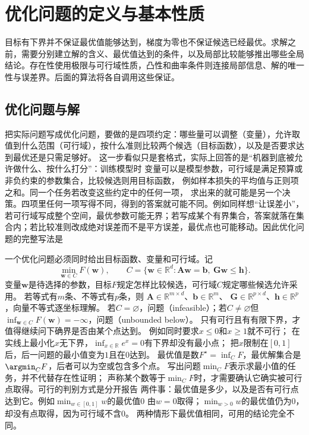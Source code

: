 \section{优化问题的定义与基本性质}
\label{sec:opt-objectives-solutions-curvature}

目标有下界并不保证最优值能够达到，梯度为零也不保证候选已经最优。求解之前，需要分别建立解的含义、最优值达到的条件，以及局部比较能够推出哪些全局结论。存在性使用极限与可行域性质，凸性和曲率条件则连接局部信息、解的唯一性与误差界。后面的算法将各自调用这些保证。

\subsection{优化问题与解}
\label{sec:opt-problem-and-solutions}
\label{sec:opt-error-objects}

把实际问题写成优化问题，要做的是四项约定：哪些量可以调整（变量），允许取值到什么范围（可行域），按什么准则比较两个候选（目标函数），以及是否要求达到最优还是只需足够好。
这一步看似只是套格式，实际上回答的是“机器到底被允许做什么、按什么打分”：训练模型时
变量可以是模型参数，可行域是满足预算或非负约束的参数集合，比较候选则用目标函数，
例如样本损失的平均值与正则项之和。同一个任务若改变这些约定中的任何一项，
求出来的就可能是另一个决策。四项里任何一项写得不同，得到的答案就可能不同。例如同样想“让误差小”，若可行域写成整个空间，最优参数可能无界；若写成某个有界集合，答案就落在集合内；若比较准则改成绝对误差而不是平方误差，最优点也可能移动。因此优化问题的完整写法是

一个优化问题必须同时给出目标函数、变量和可行域。记
\[
  \min_{\bm{w}\in C}F(\bm{w}),\qquad
  C=\{\bm{w}\in\mathbb{R}^d:
  \bm{A}\bm{w}=\bm{b},\ \bm{G}\bm{w}\leq\bm{h}\}.
\]
变量$\bm w$是待选择的参数，目标$F$规定怎样比较候选，可行域$C$规定哪些候选允许采用。
若等式有$m$条、不等式有$p$条，则
$\bm A\in\mathbb R^{m\times d}$、$\bm b\in\mathbb R^m$、
$\bm G\in\mathbb R^{p\times d}$、$\bm h\in\mathbb R^p$，向量不等式逐坐标理解。
若$C=\varnothing$，问题（infeasible）；若$C\neq\varnothing$但
$\inf_{\bm{w}\in C}F(\bm{w})=-\infty$，问题（unbounded below）。
只有可行且有有限下界，才值得继续问下确界是否由某个点达到。
例如同时要求$x\leq0$和$x\geq1$就不可行；
在实线上最小化$x$无下界，$\inf_{x\in\mathbb R}e^x=0$有下界却没有最小点；
把$x$限制在$[0,1]$后，后一问题的最小值变为$1$且在$0$达到。
最优值是数$F^\star=\inf_C F$，最优解集合是$\argmin_C F$，后者可以为空或包含多个点。
写出问题$\min_C F$表示求最小值的任务，并不代替存在性证明；
声称某个数等于$\min_C F$时，才需要确认它确实被可行点取得。可行的判别方式是分开报告
两件事：最优值是多少，以及是否有可行点达到它。例如$\min_{w\in[0,1]}w$的最优值$0$
由$w=0$取得；$\min_{w>0}w$的最优值仍为$0$，却没有点取得，因为可行域不含$0$。
两种情形下最优值相同，可用的结论完全不同。

